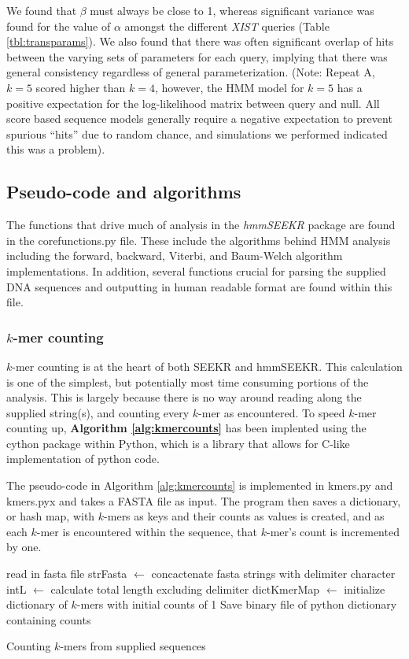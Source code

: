 We found that $\beta$ must always be close to 1, whereas significant variance was found for the value of $\alpha$ amongst the different \emph{XIST} queries (Table \ref{tbl:transparams}). We also found that there was often significant overlap of hits between the varying sets of parameters for each query, implying that there was general consistency regardless of general parameterization. (Note: Repeat A, $k=5$ scored higher than $k=4$, however, the HMM model for $k=5$ has a positive expectation for the log-likelihood matrix between query and null. All score based sequence models generally require a negative expectation \cite{Altschul1990BasicTool} to prevent spurious ``hits'' due to random chance, and simulations we performed indicated this was a problem). 
\subsection{Pseudo-code and algorithms}
The functions that drive much of analysis in the \emph{hmmSEEKR} package are found in the corefunctions.py file. These include the algorithms behind HMM analysis including the forward, backward, Viterbi, and Baum-Welch algorithm implementations. In addition, several functions crucial for parsing the supplied DNA sequences and outputting in human readable format are found within this file.

\subsubsection{$k$-mer counting}
$k$-mer counting is at the heart of both SEEKR and hmmSEEKR. This calculation is one of the simplest, but potentially most time consuming portions of the analysis. This is largely because there is no way around reading along the supplied string(s), and counting every $k$-mer as encountered. To speed $k$-mer counting up, \textbf{Algorithm \ref{alg:kmercounts}} has been implented using the cython package within Python, which is a library that allows for C-like implementation of python code.

The pseudo-code in Algorithm \ref{alg:kmercounts} is implemented in kmers.py and kmers.pyx and takes a FASTA file as input. The program then saves a dictionary, or hash map, with $k$-mers as keys and their counts as values is created, and as each $k$-mer is encountered within the sequence, that $k$-mer's count is incremented by one.

\begin{algorithm}[h]
\DontPrintSemicolon
{}
\SetAlgoLined
{}
 read in fasta file\;
 strFasta $\leftarrow$ concactenate fasta strings with delimiter character\;
 intL $\leftarrow$ calculate total length excluding delimiter\;
 dictKmerMap $\leftarrow$ initialize dictionary of $k$-mers with initial counts of 1\;
 Save binary file of python dictionary containing counts
 \caption{Counting $k$-mers from supplied sequences}
 \label{alg:kmercounts}
\end{algorithm}

